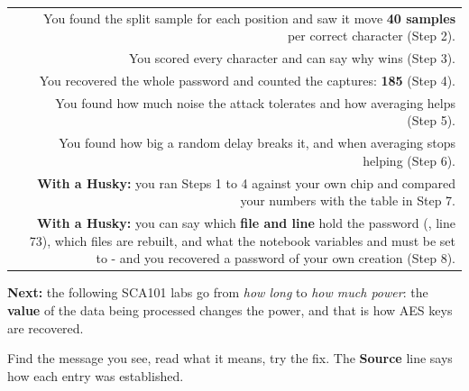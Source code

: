 \documentclass[11pt,letterpaper]{article}
\begin{document}
{\small{}
\begin{longtable}{|R{0.0652}|R{0.9348}|}
\hline
{}\hdrcell{} &  \\ \hline
\endhead
[  ] & You found the split sample for each position and saw it move \textbf{40 samples} per correct character (Step 2). \\ \hline
[  ] & You scored every character and can say why  wins (Step 3). \\ \hline
[  ] & You recovered the whole password and counted the captures: \textbf{185} (Step 4). \\ \hline
[  ] & You found how much noise the attack tolerates and how averaging helps (Step 5). \\ \hline
[  ] & You found how big a random delay breaks it, and when averaging stops helping (Step 6). \\ \hline
[  ] & \textbf{With a Husky:} you ran Steps 1 to 4 against your own chip and compared your numbers with the table in Step 7. \\ \hline
[  ] & \textbf{With a Husky:} you can say which \textbf{file and line} hold the password (, line 73), which files are rebuilt, and what the notebook variables  and  must be set to - and you recovered a password of your own creation (Step 8). \\ \hline
\end{longtable}}

\vspace{4pt}

\textbf{Next:} the following SCA101 labs go from \emph{how long} to \emph{how much power}: the \textbf{value} of the
data being processed changes the power, and that is how AES keys are recovered.

\clearpage


Find the message you see, read what it means, try the fix. The \textbf{Source} line says how each entry was
established.

\end{document}
